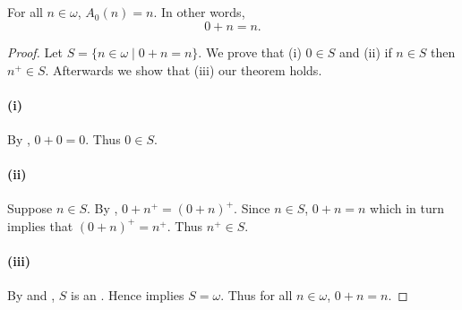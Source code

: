 \documentclass{report}
\begin{document}
\subsection{}%

\begin{lemma}

  For all $n \in \omega$, $A_0(n) = n$.
  In other words, $$0 + n = n.$$

\end{lemma}

\begin{proof}


  Let $S = \{n \in \omega \mid 0 + n = n\}$.
  We prove that (i) $0 \in S$ and (ii) if $n \in S$ then $n^+ \in S$.
  Afterwards we show that (iii) our theorem holds.

  \paragraph{(i)}%

    By , $0 + 0 = 0$.
    Thus $0 \in S$.

  \paragraph{(ii)}%

    Suppose $n \in S$.
    By , $0 + n^+ = (0 + n)^+$.
    Since $n \in S$, $0 + n = n$ which in turn implies that $(0 + n)^+ = n^+$.
    Thus $n^+ \in S$.

  \paragraph{(iii)}%

    By  and
      , $S$ is an
      .
    Hence  implies $S = \omega$.
    Thus for all $n \in \omega$, $0 + n = n$.

\end{proof}

\subsection{}%
\end{document}
